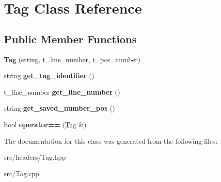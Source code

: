 \hypertarget{classTag}{\section{Tag Class Reference}
\label{classTag}
}
\subsection*{Public Member Functions}
\begin{DoxyCompactItemize}
\item 
\hypertarget{classTag_a8c107d520a979dccc728bf72e3bdc344}{{\bfseries Tag} (string, t\-\_\-line\-\_\-number, t\-\_\-pos\-\_\-number)}\label{classTag_a8c107d520a979dccc728bf72e3bdc344}

\item 
\hypertarget{classTag_aad68995f5e8193da6e8faf8b9612f25a}{string {\bfseries get\-\_\-tag\-\_\-identifier} ()}\label{classTag_aad68995f5e8193da6e8faf8b9612f25a}

\item 
\hypertarget{classTag_a0c37771e42b042ae25366bd3108fe9d3}{t\-\_\-line\-\_\-number {\bfseries get\-\_\-line\-\_\-number} ()}\label{classTag_a0c37771e42b042ae25366bd3108fe9d3}

\item 
\hypertarget{classTag_a3135714a611ab1ef50461e9989fb430c}{string {\bfseries get\-\_\-saved\-\_\-number\-\_\-pos} ()}\label{classTag_a3135714a611ab1ef50461e9989fb430c}

\item 
\hypertarget{classTag_ad91d8073141dde83849df8fe24ce8f46}{bool {\bfseries operator==} (\hyperlink{classTag}{Tag} \&)}\label{classTag_ad91d8073141dde83849df8fe24ce8f46}

\end{DoxyCompactItemize}


The documentation for this class was generated from the following files\-:\begin{DoxyCompactItemize}
\item 
src/headers/Tag.\-hpp\item 
src/Tag.\-cpp\end{DoxyCompactItemize}
